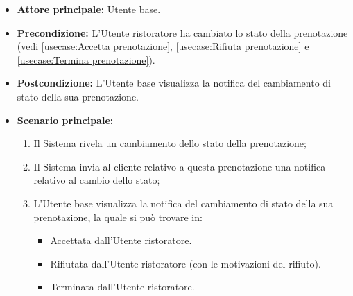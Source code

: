 \label{usecase:Visualizzazione notifica stato della prenotazione}
\begin{itemize}
	\item \textbf{Attore principale:} Utente base.
	
	\item \textbf{Precondizione:} L'Utente ristoratore ha cambiato lo stato della prenotazione (vedi \autoref{usecase:Accetta prenotazione},
     \autoref{usecase:Rifiuta prenotazione} e \autoref{usecase:Termina prenotazione}).

    
	\item \textbf{Postcondizione:} L'Utente base visualizza la notifica del cambiamento di stato della sua prenotazione.
     
	\item \textbf{Scenario principale:}
	      \begin{enumerate}
                \item Il Sistema rivela un cambiamento dello stato della prenotazione;
                \item Il Sistema invia al cliente relativo a questa prenotazione una notifica relativo al cambio dello stato;
                \item L'Utente base visualizza la notifica del cambiamento di stato della sua prenotazione, la quale si può trovare in:
                \begin{itemize}
                    \item Accettata dall'Utente ristoratore.
                    \item Rifiutata dall'Utente ristoratore (con le motivazioni del rifiuto).
                    \item Terminata dall'Utente ristoratore.
                \end{itemize}
	      \end{enumerate}
\end{itemize}